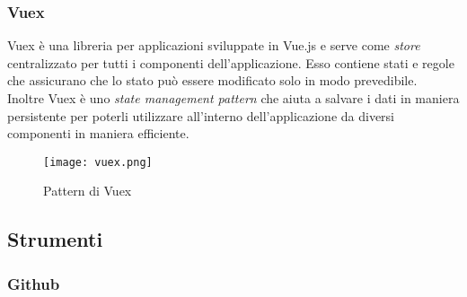 \subsubsection{Vuex}
\label{subsubsec:vuex}

Vuex è una libreria  per applicazioni sviluppate in Vue.js e serve come \textit{store} centralizzato per tutti i componenti dell'applicazione. Esso contiene stati e regole che assicurano che lo stato può essere modificato solo in modo prevedibile.\\
Inoltre Vuex è uno \textit{state management pattern} che aiuta a salvare i dati in maniera persistente per poterli utilizzare all'interno dell'applicazione da diversi componenti in maniera efficiente.
\begin{figure}[H]
	\begin{center}
		\texttt{[image: vuex.png]}
		\caption{Pattern di Vuex}
	\end{center}
\end{figure}

\subsection{Strumenti}
\label{subsec:strumenti}

\subsubsection{Github}
\label{subsubsec:github}

